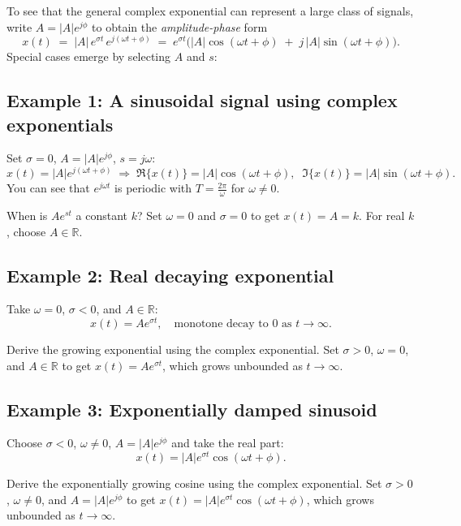To see that the general complex exponential can represent a large class of signals, write $A = |A|e^{j\phi}$ to obtain the \emph{amplitude-phase} form
\[
x(t) \;=\; |A|\,e^{\sigma t}\,e^{j(\omega t + \phi)}
\;=\; e^{\sigma t}\Big(|A|\cos(\omega t+\phi) \;+\; j\,|A|\sin(\omega t+\phi)\Big).
\]
Special cases emerge by selecting $A$ and $s$:

\subsection{Example 1: A sinusoidal signal using complex exponentials}
Set $\sigma=0$, $A=|A|e^{j\phi}$, $s=j\omega$:
\[
x(t) = |A|e^{j(\omega t+\phi)} \;\Rightarrow\;
\Re\{x(t)\} = |A|\cos(\omega t+\phi),\;\; \Im\{x(t)\}=|A|\sin(\omega t+\phi).
\]
You can see that $e^{j\omega t}$ is periodic with $T=\tfrac{2\pi}{\omega}$ for $\omega\neq 0$.

\begin{popquiz} When is $A e^{s t}$ a constant $k$?
    \popqsplit 
    Set $\omega=0$ and $\sigma=0$ to get $x(t)=A=k$. For real $k$, choose $A\in\mathbb{R}$.
\end{popquiz}
\subsection{Example 2: Real decaying exponential}
Take $\omega=0$, $\sigma<0$, and $A\in\mathbb{R}$:
\[
x(t)=A e^{\sigma t},\quad \text{monotone decay to $0$ as $t\to\infty$.}
\]
\begin{popquiz} Derive the growing exponential using the complex exponential.
    \popqsplit 
    Set $\sigma>0$, $\omega=0$, and $A\in\mathbb{R}$ to get $x(t)=A e^{\sigma t}$, which grows unbounded as $t\to\infty$.
\end{popquiz}

\subsection{Example 3: Exponentially damped sinusoid}
Choose $\sigma<0$, $\omega\neq 0$, $A=|A|e^{j\phi}$ and take the real part:
\[
x(t)=|A|e^{\sigma t}\cos(\omega t+\phi).
\]
\begin{popquiz} Derive the exponentially growing cosine using the complex exponential.
\popqsplit 
    Set $\sigma>0$, $\omega\neq 0$, and $A=|A|e^{j\phi}$ to get $x(t)=|A|e^{\sigma t}\cos(\omega t+\phi)$, which grows unbounded as $t\to\infty$.
\end{popquiz}
